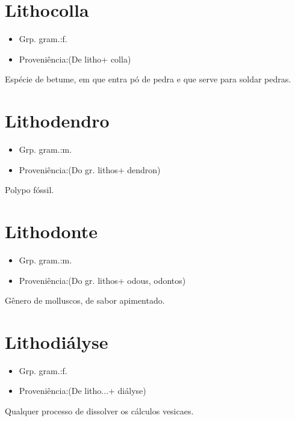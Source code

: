 \section{Lithocolla}
\begin{itemize}
\item {Grp. gram.:f.}
\end{itemize}
\begin{itemize}
\item {Proveniência:(De \textunderscore litho\textunderscore  + \textunderscore colla\textunderscore )}
\end{itemize}
Espécie de betume, em que entra pó de pedra e que serve para soldar pedras.
\section{Lithodendro}
\begin{itemize}
\item {Grp. gram.:m.}
\end{itemize}
\begin{itemize}
\item {Proveniência:(Do gr. \textunderscore lithos\textunderscore  + \textunderscore dendron\textunderscore )}
\end{itemize}
Polypo fóssil.
\section{Lithodonte}
\begin{itemize}
\item {Grp. gram.:m.}
\end{itemize}
\begin{itemize}
\item {Proveniência:(Do gr. \textunderscore lithos\textunderscore  + \textunderscore odous\textunderscore , \textunderscore odontos\textunderscore )}
\end{itemize}
Gênero de molluscos, de sabor apimentado.
\section{Lithodiályse}
\begin{itemize}
\item {Grp. gram.:f.}
\end{itemize}
\begin{itemize}
\item {Proveniência:(De \textunderscore litho...\textunderscore  + \textunderscore diályse\textunderscore )}
\end{itemize}
Qualquer processo de dissolver os cálculos vesicaes.
